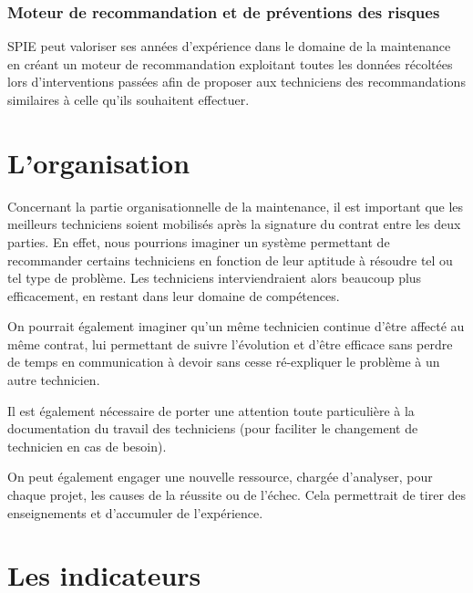     \subsubsection{Moteur de recommandation et de préventions des risques}

        SPIE peut valoriser ses années d'expérience dans le domaine de la maintenance en créant un moteur de recommandation exploitant toutes les données récoltées lors d'interventions passées afin de proposer aux techniciens des recommandations similaires à celle qu'ils souhaitent effectuer.

\section{L'organisation}
Concernant la partie organisationnelle de la maintenance, il est important que les meilleurs techniciens soient mobilisés après la signature du contrat entre les deux parties. En effet, nous pourrions imaginer un système permettant de recommander certains techniciens en fonction de leur aptitude à résoudre tel ou tel type de problème. Les techniciens interviendraient alors beaucoup plus efficacement, en restant dans leur domaine de compétences.

On pourrait également imaginer qu'un même technicien continue d'être affecté au même contrat, lui permettant de suivre l'évolution et d'être efficace sans perdre de temps en communication à devoir sans cesse ré-expliquer le problème à un autre technicien.

Il est également nécessaire de porter une attention toute particulière à la documentation du travail des techniciens (pour faciliter le changement de technicien en cas de besoin).

On peut également engager une nouvelle ressource, chargée d'analyser, pour chaque projet, les causes de la réussite ou de l'échec. Cela permettrait de tirer des enseignements et d'accumuler de l'expérience.

\section{Les indicateurs}

